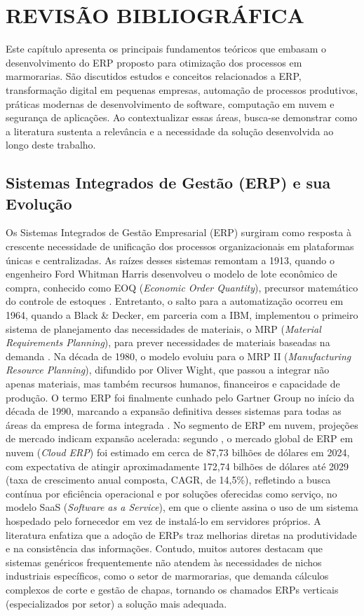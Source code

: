 \chapter{REVISÃO BIBLIOGRÁFICA}
\label{cap1Revisao}
Este capítulo apresenta os principais fundamentos teóricos que embasam o desenvolvimento do ERP proposto para otimização dos processos em marmorarias. São discutidos estudos e conceitos relacionados a ERP, transformação digital em pequenas empresas, automação de processos produtivos, práticas modernas de desenvolvimento de software, computação em nuvem e segurança de aplicações. Ao contextualizar essas áreas, busca-se demonstrar como a literatura sustenta a relevância e a necessidade da solução desenvolvida ao longo deste trabalho.

\section{Sistemas Integrados de Gestão (ERP) e sua Evolução}
Os Sistemas Integrados de Gestão Empresarial (ERP) surgiram como resposta à crescente necessidade de unificação dos processos organizacionais em plataformas únicas e centralizadas. As raízes desses sistemas remontam a 1913, quando o engenheiro Ford Whitman Harris desenvolveu o modelo de lote econômico de compra, conhecido como EOQ (\textit{Economic Order Quantity}), precursor matemático do controle de estoques \cite{harris1913}. Entretanto, o salto para a automatização ocorreu em 1964, quando a Black \& Decker, em parceria com a IBM, implementou o primeiro sistema de planejamento das necessidades de materiais, o MRP (\textit{Material Requirements Planning}), para prever necessidades de materiais baseadas na demanda \cite{jacobs2007erp}.
Na década de 1980, o modelo evoluiu para o MRP II (\textit{Manufacturing Resource Planning}), difundido por Oliver Wight, que passou a integrar não apenas materiais, mas também recursos humanos, financeiros e capacidade de produção. O termo ERP foi finalmente cunhado pelo Gartner Group no início da década de 1990, marcando a expansão definitiva desses sistemas para todas as áreas da empresa de forma integrada \cite{jacobs2007erp}. No segmento de ERP em nuvem, projeções de mercado indicam expansão acelerada: segundo , o mercado global de ERP em nuvem (\textit{Cloud ERP}) foi estimado em cerca de 87,73 bilhões de dólares em 2024, com expectativa de atingir aproximadamente 172,74 bilhões de dólares até 2029 (taxa de crescimento anual composta, CAGR, de 14,5\%), refletindo a busca contínua por eficiência operacional e por soluções oferecidas como serviço, no modelo SaaS (\textit{Software as a Service}), em que o cliente assina o uso de um sistema hospedado pelo fornecedor em vez de instalá-lo em servidores próprios. A literatura enfatiza que a adoção de ERPs traz melhorias diretas na produtividade e na consistência das informações. Contudo, muitos autores destacam que sistemas genéricos frequentemente não atendem às necessidades de nichos industriais específicos, como o setor de marmorarias, que demanda cálculos complexos de corte e gestão de chapas, tornando os chamados ERPs verticais (especializados por setor) a solução mais adequada.

